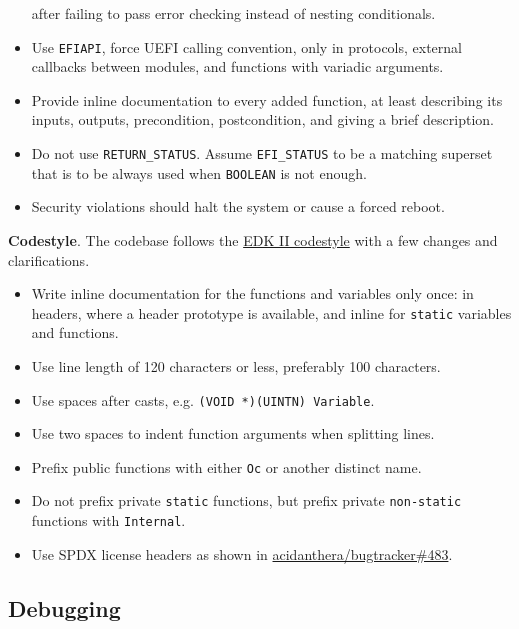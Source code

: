 \documentclass[]{article}
\providecommand{\tightlist}{%
  \setlength{\itemsep}{0pt}\setlength{\parskip}{0pt}}
\begin{document}
\begin{itemize}
after failing to pass error checking instead of nesting conditionals.
\item Use \texttt{EFIAPI}, force UEFI calling convention, only in protocols, external callbacks between
modules, and functions with variadic arguments.
\item Provide inline documentation to every added function, at least describing its inputs, outputs,
precondition, postcondition, and giving a brief description.
\item Do not use \texttt{RETURN\_STATUS}. Assume \texttt{EFI\_STATUS} to be a matching superset that is
to be always used when \texttt{BOOLEAN} is not enough.
\item Security violations should halt the system or cause a forced reboot.
\end{itemize}

\textbf{Codestyle}. The codebase follows the
\href{https://github.com/tianocore/tianocore.github.io/wiki/Code-Style-C}{EDK II codestyle}
with a few changes and clarifications.
\begin{itemize}
\tightlist
\item Write inline documentation for the functions and variables only once: in headers, where a header prototype
is available, and inline for \texttt{static} variables and functions.
\item Use line length of 120 characters or less, preferably 100 characters.
\item Use spaces after casts, e.g. \texttt{(VOID *)(UINTN) Variable}.
\item Use two spaces to indent function arguments when splitting lines.
\item Prefix public functions with either \texttt{Oc} or another distinct name.
\item Do not prefix private \texttt{static} functions, but prefix private \texttt{non-static} functions with \texttt{Internal}.
\item Use SPDX license headers as shown in
\href{https://github.com/acidanthera/bugtracker/issues/483}{acidanthera/bugtracker\#483}.
\end{itemize}

\subsection{Debugging}\label{configuration-debug}
\end{document}
